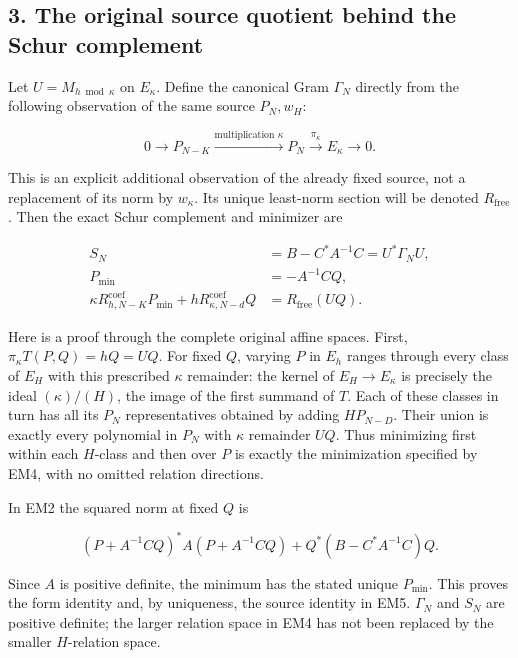 \subsection{3. The original source quotient behind the Schur complement}\label{EM-the-original-source-quotient-behind-the-schur-complement}

Let \(U=M_{h\bmod\kappa}\) on \(E_\kappa\). Define the canonical Gram \(\Gamma_N\)
directly from the following observation of the same source \(P_N,w_H\):

\[
0\longrightarrow P_{N-K}\xrightarrow{\text{multiplication }\kappa}P_N\xrightarrow{\pi_\kappa}E_\kappa\longrightarrow0.\tag{EM4}
\]

This is an explicit additional observation of the already fixed source,
not a replacement of its norm by \(w_\kappa\). Its unique least-norm section
will be denoted \(R_{\mathrm{free}}\). Then the exact Schur complement and minimizer are

\[
\begin{aligned}S_N&=B-C^*A^{-1}C=U^*\Gamma_NU,\\P_{\min}&=-A^{-1}CQ,\\\kappa R_{h,N-K}^{\mathrm{coef}}P_{\min}+hR_{\kappa,N-d}^{\mathrm{coef}}Q&=R_{\mathrm{free}}(UQ).\end{aligned}\tag{EM5}
\]

Here is a proof through the complete original affine spaces. First,
\(\pi_\kappa T(P,Q)=hQ=UQ\). For fixed \(Q\), varying \(P\) in \(E_h\) ranges through
every class of \(E_H\) with this prescribed \(\kappa\) remainder: the kernel
of \(E_H\longrightarrow E_\kappa\) is precisely the ideal \((\kappa)/(H)\), the image of
the first summand of \(T\). Each of these classes in turn has all its
\(P_N\) representatives obtained by adding \(HP_{N-D}\). Their union is
exactly every polynomial in \(P_N\) with \(\kappa\) remainder \(UQ\). Thus minimizing
first within each \(H\)-class and then over \(P\) is exactly the minimization
specified by EM4, with no omitted relation directions.

In EM2 the squared norm at fixed \(Q\) is

\[
(P+A^{-1}CQ)^*A(P+A^{-1}CQ)+Q^*(B-C^*A^{-1}C)Q.
\]

Since \(A\) is positive definite, the minimum has the stated unique \(P_{\min}\).
This proves the form identity and, by uniqueness, the source identity in
EM5. \(\Gamma_N\) and \(S_N\) are positive definite; the larger relation space in
EM4 has not been replaced by the smaller \(H\)-relation space.

